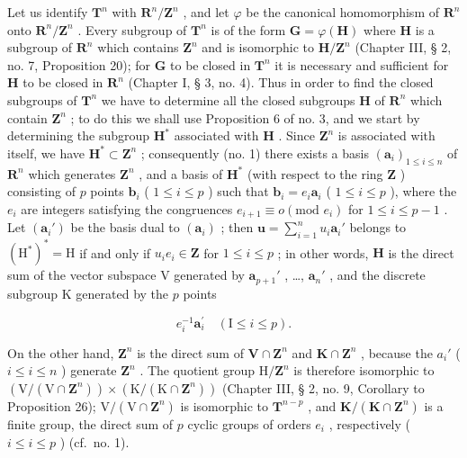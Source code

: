 Let us identify \(\mathbf{T}^n\) with \(\mathbf{R}^n/\mathbf{Z}^n\) , and let \(\varphi\) be the canonical homomorphism of \(\mathbf{R}^n\) onto \(\mathbf{R}^n/\mathbf{Z}^n\) . Every subgroup of \(\mathbf{T}^n\) is of the form \(\mathbf{G} = \varphi(\mathbf{H})\) where \(\mathbf{H}\) is a subgroup of \(\mathbf{R}^n\) which contains \(\mathbf{Z}^n\) and is isomorphic to \(\mathbf{H}/\mathbf{Z}^n\) (Chapter III, § 2, no. 7, Proposition 20); for \(\mathbf{G}\) to be closed in \(\mathbf{T}^n\) it is necessary and sufficient for \(\mathbf{H}\) to be closed in \(\mathbf{R}^n\) (Chapter I, § 3, no. 4). Thus in order to find the closed subgroups of \(\mathbf{T}^n\) we have to determine all the closed subgroups \(\mathbf{H}\) of \(\mathbf{R}^n\) which contain \(\mathbf{Z}^n\) ; to do this we shall use Proposition 6 of no. 3, and we start by determining the subgroup \(\mathbf{H}^*\) associated with \(\mathbf{H}\) . Since \(\mathbf{Z}^n\) is associated with itself, we have \(\mathbf{H}^* \subset \mathbf{Z}^n\) ; consequently (no. 1) there exists a basis \((\boldsymbol{a}_i)_{1 \leqslant i \leqslant n}\) of \(\mathbf{R}^n\) which generates \(\mathbf{Z}^n\) , and a basis of \(\mathbf{H}^*\) (with respect to the ring \(\mathbf{Z}\) ) consisting of \(p\) points \(\boldsymbol{b}_i\) ( \(1 \leqslant i \leqslant p\) ) such that \(\boldsymbol{b}_i = e_i \boldsymbol{a}_i\) ( \(1 \leqslant i \leqslant p\) ), where the \(e_i\) are integers satisfying the congruences \(e_{i+1} \equiv o (\text{mod } e_i)\) for \(1 \leqslant i \leqslant p - 1\) . Let \((\boldsymbol{a}_i')\) be the basis dual to \((\boldsymbol{a}_i)\) ; then \(\boldsymbol{u} = \sum_{i=1}^{n} u_i \boldsymbol{a}_i'\) belongs to \((\mathrm{H}^*)^* = \mathrm{H}\) if and only if \(u_i e_i \in \mathbf{Z}\) for \(1 \leqslant i \leqslant p\) ; in other words, \(\mathbf{H}\) is the direct sum of the vector subspace V generated by \(\boldsymbol{a}_{p+1}'\) , \ldots, \(\boldsymbol{a}_n'\) , and the discrete subgroup K generated by the \(p\) points

\[
e _ {i} ^ {- 1} \boldsymbol {a} _ {i} ^ {\prime} \quad (\mathrm{I} \leqslant i \leqslant p).
\]

On the other hand, \(\mathbf{Z}^n\) is the direct sum of \(\mathbf{V} \cap \mathbf{Z}^n\) and \(\mathbf{K} \cap \mathbf{Z}^n\) , because the \(a_i'\) ( \(i \leqslant i \leqslant n\) ) generate \(\mathbf{Z}^n\) . The quotient group \(\mathrm{H} / \mathbf{Z}^n\) is therefore isomorphic to \((\mathrm{V} / (\mathrm{V} \cap \mathbf{Z}^n)) \times (\mathrm{K} / (\mathrm{K} \cap \mathbf{Z}^n))\) (Chapter III, § 2, no. 9, Corollary to Proposition 26); \(\mathrm{V} / (\mathrm{V} \cap \mathbf{Z}^n)\) is isomorphic to \(\mathbf{T}^{n-p}\) , and \(\mathbf{K} / (\mathbf{K} \cap \mathbf{Z}^n)\) is a finite group, the direct sum of \(p\) cyclic groups of orders \(e_i\) , respectively ( \(i \leqslant i \leqslant p\) ) (cf.~no. 1).

